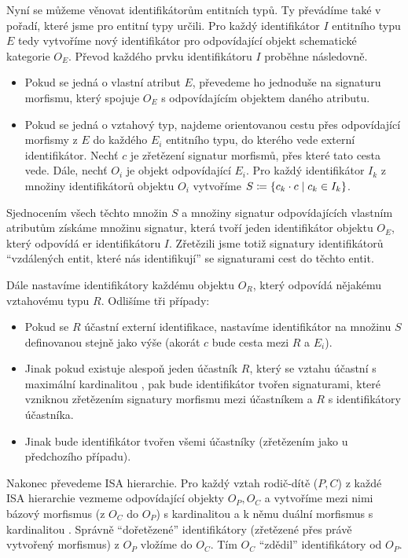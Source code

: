 Nyní se můžeme věnovat identifikátorům entitních typů.
Ty převádíme také v pořadí, které jsme pro entitní typy určili.
Pro každý identifikátor $I$ entitního typu $E$ tedy vytvoříme nový identifikátor pro odpovídající objekt schematické kategorie $O_E$.
Převod každého prvku identifikátoru $I$ proběhne následovně.
\begin{itemize}
  \item Pokud se jedná o vlastní atribut $E$, převedeme ho jednoduše na signaturu morfismu, který spojuje $O_E$ s odpovídajícím objektem daného atributu.
  \item Pokud se jedná o vztahový typ, najdeme orientovanou cestu přes odpovídající morfismy z $E$ do každého $E_i$ entitního typu, do kterého vede externí identifikátor.
        Nechť $c$ je zřetězení signatur morfismů, přes které tato cesta vede.
        Dále, nechť $O_i$ je objekt odpovídající $E_i$.
        Pro každý identifikátor $I_k$ z množiny identifikátorů objektu $O_i$ vytvoříme $S\coloneqq \left\{c_k\cdot c\mid c_k\in I_k\right\}$.
\end{itemize}
Sjednocením všech těchto množin $S$ a množiny signatur odpovídajících vlastním atributům získáme množinu signatur, která tvoří jeden identifikátor objektu $O_E$, který odpovídá \acrshort{er} identifikátoru $I$.
Zřetězili jsme totiž signatury identifikátorů \enquote{vzdálených entit, které nás identifikují} se signaturami cest do těchto entit.

Dále nastavíme identifikátory každému objektu $O_R$, který odpovídá nějakému vztahovému typu $R$.
Odlišíme tři případy:
\begin{itemize}
  \item Pokud se $R$ účastní externí identifikace, nastavíme identifikátor na množinu $S$ definovanou stejně jako výše (akorát $c$ bude cesta mezi $R$ a $E_i$).
  \item Jinak pokud existuje alespoň jeden účastník $R$, který se vztahu účastní s maximální kardinalitou \one, pak bude identifikátor tvořen signaturami, které vzniknou zřetězením signatury morfismu mezi účastníkem a $R$ s identifikátory účastníka.
  \item Jinak bude identifikátor tvořen všemi účastníky (zřetězením jako u předchozího případu).
\end{itemize}

Nakonec převedeme ISA hierarchie.
Pro každý vztah rodič-dítě ($P, C$) z každé ISA hierarchie vezmeme odpovídající objekty $O_P, O_C$ a vytvoříme mezi nimi bázový morfismus (z $O_C$ do $O_P$) s kardinalitou \oneone{} a k němu duální morfismus s kardinalitou \oneone{}.
Správně \enquote{dořetězené} identifikátory (zřetězené přes právě vytvořený morfismus) z $O_P$ vložíme do $O_C$.
Tím $O_C$ \enquote{zdědil} identifikátory od $O_P$.

